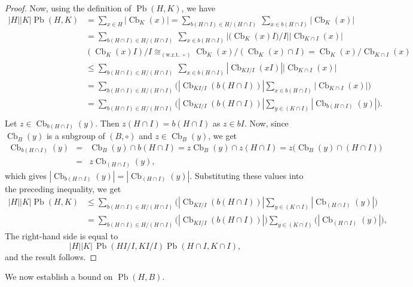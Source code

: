 \documentclass[11pt, oneside]{amsart}
\numberwithin{equation}{section}
\theoremstyle{plain}
\theoremstyle{definition}
\newcommand{\Cb}{\operatorname{Cb} }
\newcommand{\Pb}{\operatorname{Pb} }
\begin{document}
\begin{proof}
Now, using the definition of $\Pb(H,K)$, we have
\begin{align*}
  |H||K|\Pb(H,K) &=\sum_{x\in H}|\Cb_{K}(x)| =\sum_{b (H\cap I)\in{H/(H\cap I)}} ~ \sum_{x\in b (H\cap I)}|\Cb_{K}(x)|\\
             &=\sum_{b (H\cap I)\in{H/(H\cap I)}} ~ \sum_{x\in b (H\cap I)}|{(\Cb_{K}(x) I})/I||\Cb_{K\cap I}(x)|\\
             &(\Cb_{K}(x) I)/I \cong_{(\text{w.r.t. }\circ)} \Cb_K(x)/(\Cb_K(x) \cap I) = \Cb_K(x)/\Cb_{K\cap I}(x)\\
             &\leqslant \sum_{b (H\cap I)\in{H/(H\cap I)}} ~ \sum_{x\in b (H\cap I)}|\Cb_{KI/I}(x I)| |\Cb_{K\cap I}(x)|\\  
             &= \sum_{b (H\cap I)\in{H/(H\cap I)}}\Big(|\Cb_{KI/I}(b (H\cap I))|\sum_{x\in b (H\cap I)}|\Cb_{K\cap I}(x)|\Big)\\   
             &= \sum_{b (H\cap I)\in{H/(H\cap I)}}\Big(|\Cb_{KI/I}(b (H\cap I))| \sum_{y\in (K\cap I)}|\Cb_{b (H\cap I)}(y)|\Big).\\                      
      \end{align*}
      Let $z \in   \Cb_{b (H\cap I)}(y)$.  Then $z  (H\cap I) = b (H\cap I)$ as $z \in b  I$. Now, since $\Cb_{B}(y)$ is a subgroup of $(B, \circ)$ and $z \in \Cb_B(y)$, we get
    \begin{eqnarray*}
        \Cb_{b (H\cap I)}(y) &=&\Cb_{B}(y)\cap b (H\cap I) = z \Cb_{B}(y) \cap z (H\cap I) = z \big(\Cb_{B}(y)\cap (H\cap I)\big)\\
        &=& z   \Cb_{(H\cap I)}(y),
        \end{eqnarray*}
     which gives $|\Cb_{b (H\cap I)}(y)| = |\Cb_{(H\cap I)}(y)|$. Substituting these values into the preceding inequality, we get
    \begin{align*}
        |H||K|\Pb(H,K)  &\leqslant \sum_{b (H\cap I)\in{H/(H\cap I)}}\Big(|\Cb_{KI/I}(b (H\cap I))| \sum_{y\in (K\cap I)}|\Cb_{(H\cap I)}(y)|\Big)\\
        &= \sum_{b (H\cap I)\in{H/(H\cap I)}}\big(|\Cb_{KI/I}(b (H\cap I))|\big) \sum_{y\in (K\cap I)}\big(|\Cb_{(H\cap I)}(y)|\big),
    \end{align*}
    The right-hand side is equal to
    $$
    |H||K|\,\Pb(HI/I,KI/I)\Pb(H\cap I,K\cap I),
    $$
    and the result follows.
\end{proof}
    

 We now establish a bound on  $\Pb (H,B)$.
      
\end{document}
